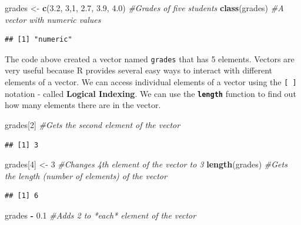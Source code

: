\documentclass[]{krantz}
\makeatletter
\newenvironment{Shaded}{\begin{snugshade}}{\end{snugshade}}
\newcommand{\KeywordTok}[1]{\textcolor[rgb]{0.27,0.27,0.27}{\textbf{#1}}}
\newcommand{\DecValTok}[1]{\textcolor[rgb]{0.06,0.06,0.06}{#1}}
\newcommand{\FloatTok}[1]{\textcolor[rgb]{0.06,0.06,0.06}{#1}}
\newcommand{\StringTok}[1]{\textcolor[rgb]{0.5,0.5,0.5}{#1}}
\newcommand{\CommentTok}[1]{\textcolor[rgb]{0.56,0.35,0.01}{\textit{#1}}}
\newcommand{\OperatorTok}[1]{\textcolor[rgb]{0.81,0.36,0.00}{\textbf{#1}}}
\newcommand{\NormalTok}[1]{#1}
\newenvironment{kframe}{%
\medskip{}
\setlength{\fboxsep}{.8em}
 \def\at@end@of@kframe{}%
 \ifinner\ifhmode%
  \def\at@end@of@kframe{\end{minipage}}%
  \begin{minipage}{\columnwidth}%
 \fi\fi%
 \def\FrameCommand##1{\hskip\@totalleftmargin \hskip-\fboxsep
 \colorbox{shadecolor}{##1}\hskip-\fboxsep
     \hskip-\linewidth \hskip-\@totalleftmargin \hskip\columnwidth}%
 \MakeFramed {\advance\hsize-\width
   \@totalleftmargin\z@ \linewidth\hsize
   \@setminipage}}%
 {\par\unskip\endMakeFramed%
 \at@end@of@kframe}
\renewenvironment{Shaded}{\begin{kframe}}{\end{kframe}}
\theoremstyle{definition}
\theoremstyle{definition}
\theoremstyle{definition}
\theoremstyle{remark}
\makeatother
\begin{document}
\begin{Shaded}
\begin{Highlighting}[]
\NormalTok{grades <-}\StringTok{ }\KeywordTok{c}\NormalTok{(}\FloatTok{3.2}\NormalTok{, }\DecValTok{3}\NormalTok{,}\DecValTok{1}\NormalTok{, }\FloatTok{2.7}\NormalTok{, }\FloatTok{3.9}\NormalTok{, }\FloatTok{4.0}\NormalTok{) }\CommentTok{#Grades of five students}
\KeywordTok{class}\NormalTok{(grades) }\CommentTok{#A vector with numeric values}
\end{Highlighting}
\end{Shaded}

\begin{verbatim}
## [1] "numeric"
\end{verbatim}

The code above created a vector named \texttt{grades} that has 5
elements. Vectors are very useful because R provides several easy ways
to interact with different elements of a vector. We can access
individual elements of a vector using the \texttt{{[}\ {]}} notation -
called \textbf{Logical Indexing}. We can use the
\textbf{\texttt{length}} function to find out how many elements there
are in the vector.

\begin{Shaded}
\begin{Highlighting}[]
\NormalTok{grades[}\DecValTok{2}\NormalTok{] }\CommentTok{#Gets the second element of the vector}
\end{Highlighting}
\end{Shaded}

\begin{verbatim}
## [1] 3
\end{verbatim}

\begin{Shaded}
\begin{Highlighting}[]
\NormalTok{grades[}\DecValTok{4}\NormalTok{] <-}\StringTok{ }\DecValTok{3} \CommentTok{#Changes 4th element of the vector to 3}
\KeywordTok{length}\NormalTok{(grades) }\CommentTok{#Gets the length (number of elements) of the vector}
\end{Highlighting}
\end{Shaded}

\begin{verbatim}
## [1] 6
\end{verbatim}

\begin{Shaded}
\begin{Highlighting}[]
\NormalTok{grades }\OperatorTok{-}\StringTok{ }\FloatTok{0.1} \CommentTok{#Adds 2 to *each* element of the vector }
\end{Highlighting}
\end{Shaded}
\end{document}
